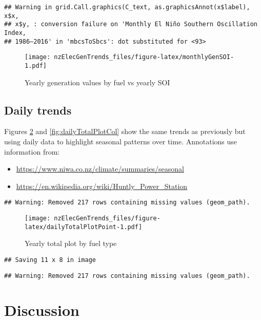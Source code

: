 \documentclass[]{article}
\providecommand{\tightlist}{%
  \setlength{\itemsep}{0pt}\setlength{\parskip}{0pt}}
\theoremstyle{definition}
\theoremstyle{definition}
\theoremstyle{definition}
\theoremstyle{remark}
\begin{document}
\begin{verbatim}
## Warning in grid.Call.graphics(C_text, as.graphicsAnnot(x$label), x$x,
## x$y, : conversion failure on 'Monthly El Niño Southern Oscillation Index,
## 1986–2016' in 'mbcsToSbcs': dot substituted for <93>
\end{verbatim}

\begin{figure}
\centering
\texttt{[image: nzElecGenTrends\_files/figure-latex/monthlyGenSOI-1.pdf]}
\caption{\label{fig:monthlyGenSOI}Yearly generation values by fuel vs yearly
SOI}
\end{figure}

\subsection{Daily trends}\label{daily-trends}

Figures \ref{fig:dailyTotalPlotPoint} and \ref{fig:dailyTotalPlotCol}
show the same trends as previously but using daily data to highlight
seasonal patterns over time. Annotations use information from:

\begin{itemize}
\tightlist
\item
  \url{https://www.niwa.co.nz/climate/summaries/seasonal}
\item
  \url{https://en.wikipedia.org/wiki/Huntly_Power_Station}
\end{itemize}

\begin{verbatim}
## Warning: Removed 217 rows containing missing values (geom_path).
\end{verbatim}

\begin{figure}
\centering
\texttt{[image: nzElecGenTrends\_files/figure-latex/dailyTotalPlotPoint-1.pdf]}
\caption{\label{fig:dailyTotalPlotPoint}Yearly total plot by fuel type}
\end{figure}

\begin{verbatim}
## Saving 11 x 8 in image
\end{verbatim}

\begin{verbatim}
## Warning: Removed 217 rows containing missing values (geom_path).
\end{verbatim}

\section{Discussion}\label{discussion}
\end{document}
